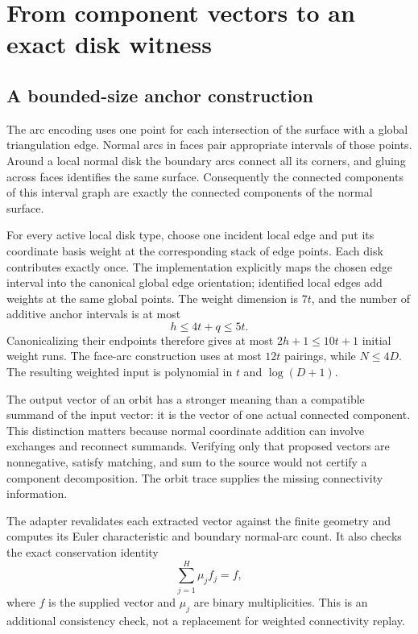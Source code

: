 \documentclass[11pt,a4paper]{article}
\theoremstyle{definition}
\theoremstyle{remark}
\begin{document}


\section{From component vectors to an exact disk witness}
\label{sec:disk-extraction}

\subsection{A bounded-size anchor construction}

The arc encoding uses one point for each intersection of the surface with
a global triangulation edge. Normal arcs in faces pair appropriate
intervals of those points. Around a local normal disk the boundary arcs
connect all its corners, and gluing across faces identifies the same
surface. Consequently the connected components of this interval graph
are exactly the connected components of the normal surface.

For every active local disk type, choose one incident local edge and put
its coordinate basis weight at the corresponding stack of edge points.
Each disk contributes exactly once. The implementation explicitly maps
the chosen edge interval into the canonical global edge orientation;
identified local edges add weights at the same global points. The weight
dimension is $7t$, and the number of additive anchor intervals is at most
\[
        h\le 4t+q\le5t.
\]
Canonicalizing their endpoints therefore gives at most $2h+1\le10t+1$
initial weight runs. The face-arc construction uses at most $12t$
pairings, while $N\le4D$. The resulting weighted input is polynomial in
$t$ and $\log(D+1)$.

The output vector of an orbit has a stronger meaning than a compatible
summand of the input vector: it is the vector of one actual connected
component. This distinction matters because normal coordinate addition
can involve exchanges and reconnect summands. Verifying only that proposed
vectors are nonnegative, satisfy matching, and sum to the source would
not certify a component decomposition. The orbit trace supplies the
missing connectivity information.

The adapter revalidates each extracted vector against the finite geometry
and computes its Euler characteristic and boundary normal-arc count. It
also checks the exact conservation identity
\[
             \sum_{j=1}^{H}\mu_j f_j=f,
\]
where $f$ is the supplied vector and $\mu_j$ are binary multiplicities.
This is an additional consistency check, not a replacement for weighted
connectivity replay.
\end{document}
